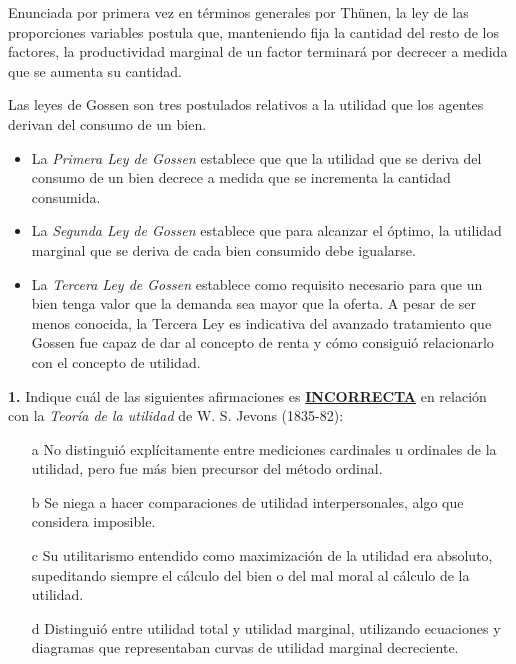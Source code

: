 \documentclass{nuevotema}
\begin{document}

Enunciada por primera vez en términos generales por Thünen, la ley de las proporciones variables postula que, manteniendo fija la cantidad del resto de los factores, la productividad marginal de un factor terminará por decrecer a medida que se aumenta su cantidad.


Las leyes de Gossen son tres postulados relativos a la utilidad que los agentes derivan del consumo de un bien. 
\begin{itemize} 
\item La \textit{Primera Ley de Gossen} establece que que la utilidad que se deriva del consumo de un bien decrece a medida que se incrementa la cantidad consumida. 
\item La \textit{Segunda Ley de Gossen} establece que para alcanzar el óptimo, la utilidad marginal que se deriva de cada bien consumido debe igualarse. 
\item La \textit{Tercera Ley de Gossen} establece como requisito necesario para que un bien tenga valor que la demanda sea mayor que la oferta. A pesar de ser menos conocida, la Tercera Ley es indicativa del avanzado tratamiento que Gossen fue capaz de dar al concepto de renta y cómo consiguió relacionarlo con el concepto de utilidad.
\end{itemize}

\preguntas

\textbf{1.} Indique cuál de las siguientes afirmaciones es \underline{\textbf{INCORRECTA}} en relación con la \textit{Teoría de la utilidad} de W. S. Jevons (1835-82):

\begin{itemize}
	\item[a] No distinguió explícitamente entre mediciones cardinales u ordinales de la utilidad, pero fue más bien precursor del método ordinal.
	\item[b] Se niega a hacer comparaciones de utilidad interpersonales, algo que considera imposible.
	\item[c] Su utilitarismo entendido como maximización de la utilidad era absoluto, supeditando siempre el cálculo del bien o del mal moral al cálculo de la utilidad.
	\item[d] Distinguió entre utilidad total y utilidad marginal, utilizando ecuaciones y diagramas que representaban curvas de utilidad marginal decreciente.
\end{itemize}
\end{document}
